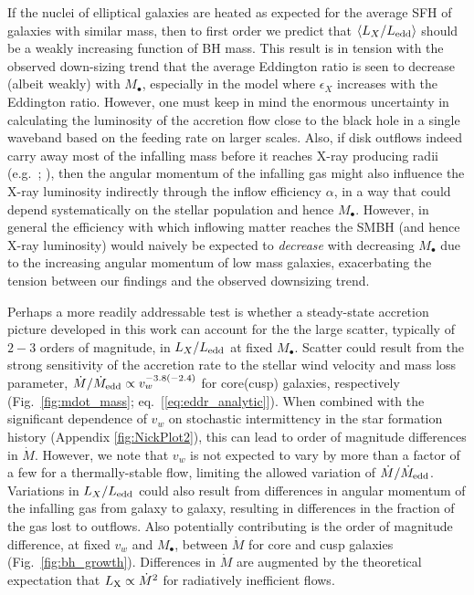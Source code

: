 \documentclass[usenatbib,fleqn]{mn2e}
\begin{document}
If the nuclei of elliptical galaxies are heated as expected for the
average SFH of galaxies with similar mass, then to first order we
predict that $\langle L_{X}/L_{\rm edd}\rangle$ should be a weakly
increasing function of BH mass.  This result is in tension with the
observed down-sizing trend that the average Eddington ratio is seen to
decrease (albeit weakly) with $M_{\bullet}$, especially in the model where
$\epsilon_X$ increases with the Eddington ratio.
However, one must keep in mind the enormous uncertainty in calculating
the luminosity of the accretion flow close to the black hole in a
single waveband based on the feeding rate on larger scales.  Also, if disk
outflows indeed carry away most of the infalling mass before it reaches X-ray
producing radii (e.g.~\citealt{Blandford&Begelman99};
\citealt{Li+13}), then the angular momentum of the infalling gas might
also influence the X-ray luminosity indirectly through the inflow efficiency $\alpha$, in a way that could depend systematically on the stellar population and hence $M_{\bullet}$.  However, in general the efficiency with which inflowing matter reaches the SMBH (and hence X-ray luminosity) would naively be expected to {\it decrease} with decreasing $M_{\bullet}$ due to the increasing angular momentum of low mass galaxies, exacerbating the tension between our findings and the observed downsizing trend.

Perhaps a more readily addressable test is whether a steady-state
accretion picture developed in this work can account for the the large
scatter, typically of $2-3$ orders of magnitude, in $L_{X}/L_{\rm
  edd}$ at fixed $M_{\bullet}$.  Scatter could result from the strong
sensitivity of the accretion rate to the stellar wind velocity and
mass loss parameter, $\dot{M}/\dot{M}_{\rm edd} \propto
v_{w}^{-3.8(-2.4)}$ for core(cusp) galaxies, respectively
(Fig.~\ref{fig:mdot_mass}; eq.~[\ref{eq:eddr_analytic}]).  When
combined with the significant dependence of $v_w$ on stochastic
intermittency in the star formation history (Appendix
\ref{fig:NickPlot2}), this can lead to order of magnitude differences
in $\dot{M}$.  However, we note that $v_w$ is not expected to vary by
more than a factor of a few for a thermally-stable flow, limiting the
allowed variation of $\dot{M}/\dot{M}_{\rm edd}$.  Variations in
$L_{X}/L_{\rm edd}$ could also result from differences in angular
momentum of the infalling gas from galaxy to galaxy, resulting in
differences in the fraction of the gas lost to outflows.  Also
potentially contributing is the order of magnitude difference, at
fixed $v_w$ and $M_{\bullet}$, between $\dot{M}$ for core and cusp
galaxies (Fig.~\ref{fig:bh_growth}).  Differences in $\dot{M}$ are
augmented by the theoretical expectation that $L_{\rm X} \propto
\dot{M}^{2} $ for radiatively inefficient flows.
\end{document}
